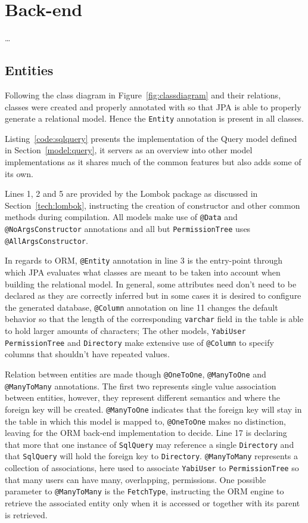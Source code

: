 \section{Back-end}\label{cha:implementation:sec:back-end}
\dots

\subsection{Entities}
Following the class diagram in Figure~\ref{fig:classdiagram} and their relations, classes were created and properly annotated with so that \gls{JPA} is able to properly generate a relational model. Hence the \texttt{Entity} annotation is present in all classes.

Listing~\ref{code:sqlquery} presents the implementation of the Query model defined in Section~\ref{model:query}, it servers as an overview into other model implementations as it shares much of the common features but also adds some of its own.

Lines 1, 2 and 5 are provided by the Lombok package as discussed in Section~\ref{tech:lombok}, instructing the creation of constructor and other common methods during compilation. All models make use of \texttt{@Data} and \texttt{@NoArgsConstructor} annotations and all but \texttt{PermissionTree} uses \texttt{@AllArgsConstructor}.

In regards to \gls{ORM}, \texttt{@Entity} annotation in line 3 is the entry-point through which \gls{JPA} evaluates what classes are meant to be taken into account when building the relational model.
In general, some attributes need don't need to be declared as they are correctly inferred but in some cases it is desired to configure the generated database, \texttt{@Column} annotation on line 11 changes the default behavior so that the length of the corresponding \texttt{varchar} field in the table is able to hold larger amounts of characters; The other models, \texttt{YabiUser} \texttt{PermissionTree} and \texttt{Directory} make extensive use of \texttt{@Column} to specify columns that shouldn't have repeated values.

Relation between entities are made though \texttt{@OneToOne}, \texttt{@ManyToOne} and \texttt{@ManyToMany} annotations.
The first two represents single value association between entities, however, they represent different semantics and where the foreign key will be created.
\texttt{@ManyToOne} indicates that the foreign key will stay in the table in which this model is mapped to, \texttt{@OneToOne} makes no distinction, leaving for the \gls{ORM} back-end implementation to decide.
Line 17 is declaring that more that one instance of \texttt{SqlQuery} may reference a single \texttt{Directory} and that \texttt{SqlQuery} will hold the foreign key to \texttt{Directory}.
\texttt{@ManyToMany} represents a collection of associations, here used to associate \texttt{YabiUser} to \texttt{PermissionTree} so that many users can have many, overlapping, permissions. One possible parameter to \texttt{@ManyToMany} is the \texttt{FetchType}, instructing the \gls{ORM} engine to retrieve the associated entity only when it is accessed or together with its parent is retrieved.

